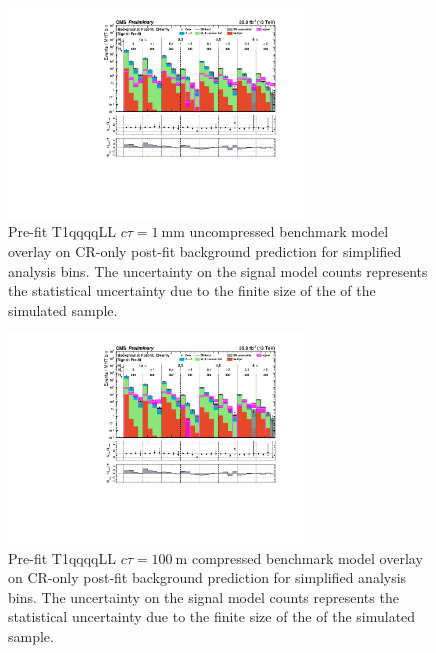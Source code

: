 \begin{figure}[h!]
    \begin{center}
        \includegraphics[width=0.7\textwidth]{figures/susyLLResults/app/T1qqqqLL_ctau_1_mGluino-1200_mLSP-1100/all_full-fit-sig}
        \caption{
            Pre-fit T1qqqqLL $c\tau=1~\mathrm{mm}$ uncompressed benchmark
            model overlay on CR-only post-fit background prediction for
            simplified analysis bins. The uncertainty on the signal model counts
            represents the statistical uncertainty due to the finite size of the
            of the simulated sample.
        }
        \label{fig:T1qqqqLL_ctau_1_uncompressed_MR_simp}
    \end{center}
\end{figure}

\begin{figure}[h!]
    \begin{center}
        \includegraphics[width=0.7\textwidth]{figures/susyLLResults/app/T1qqqqLL_ctau_100000_mGluino-1000_mLSP-200/all_full-fit-sig}
        \caption{
            Pre-fit T1qqqqLL $c\tau=100~\mathrm{m}$ compressed benchmark
            model overlay on CR-only post-fit background prediction for
            simplified analysis bins. The uncertainty on the signal model counts
            represents the statistical uncertainty due to the finite size of the
            of the simulated sample.
        }
        \label{fig:T1qqqqLL_ctau_100000_compressed_MR_simp}
    \end{center}
\end{figure}

